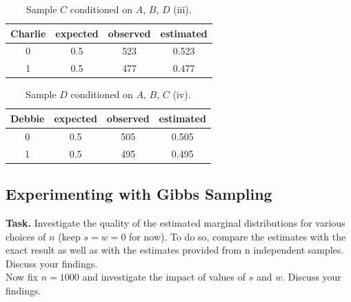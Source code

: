 \documentclass{support/acm_proc_article-sp}
\begin{document}
    \begin{table}[!htbp]
        \begin{center}
            \begin{tabular}{ c c c c }
                Charlie & expected & observed & estimated \\
                \hline
                0 & 0.5 & 523 & 0.523 \\
                1 & 0.5 & 477 & 0.477 \\
            \end{tabular}
        \end{center}
        \caption{Sample $C$ conditioned on $A$, $B$, $D$ (iii).}
        \label{table:gibbs-c}
    \end{table}

    \begin{table}[!htbp]
        \begin{center}
            \begin{tabular}{ c c c c }
                Debbie & expected & observed & estimated \\
                \hline
                0 & 0.5 & 505 & 0.505 \\
                1 & 0.5 & 495 & 0.495 \\
            \end{tabular}
        \end{center}
        \caption{Sample $D$ conditioned on $A$, $B$, $C$ (iv).}
        \label{table:gibbs-d}
    \end{table}


    \subsection{Experimenting with Gibbs Sampling}
    \label{sec:gibbs-experiments}

    \textbf{Task.} Investigate the quality of the estimated marginal distributions for various choices of $n$
    (keep $s = w = 0$ for now).
    To do so, compare the estimates with the exact result as well as with the estimates provided from n independent
    samples.
    Discuss your findings. \\
    Now fix $n = 1000$ and investigate the impact of values of $s$ and $w$.
    Discuss your findings.
\end{document}
